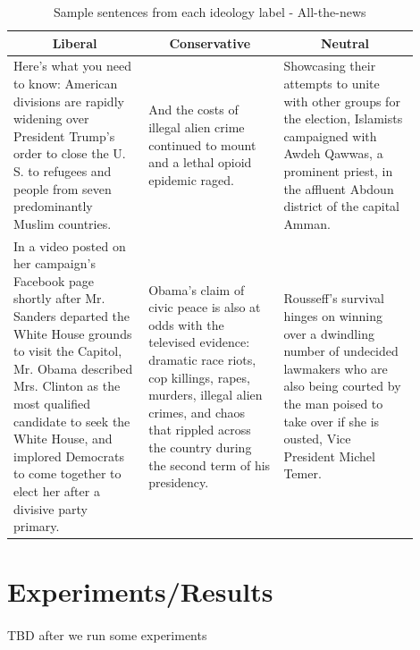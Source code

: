 \documentclass[10pt,a4paper,onecolumn]{article}
\begin{document}
\begin{table}[h!]
	\begin{center}
		\caption{Sample sentences from each ideology label - All-the-news	}
		\label{tab:atn-sentences}
		\begin{tabular}{p{0.3\linewidth}|p{0.3\linewidth}|p{0.3\linewidth}}
			\hline\hline
			\multicolumn{1}{c|}{\textbf{Liberal}} & \multicolumn{1}{c|}{\textbf{Conservative}} & \multicolumn{1}{c|}{\textbf{Neutral}}\\
			\hline
			Here’s what you need to know: American divisions are rapidly widening over President Trump’s order to close the U. S. to refugees and people from seven predominantly Muslim countries. & And the costs of illegal alien crime continued to mount and a lethal opioid epidemic raged. & Showcasing their attempts to unite with other groups for the election, Islamists campaigned with Awdeh Qawwas, a prominent priest, in the affluent Abdoun district of the capital Amman. \\
			In a video posted on her campaign’s Facebook page shortly after Mr. Sanders departed the White House grounds to visit the Capitol, Mr. Obama described Mrs. Clinton as the most qualified candidate to seek the White House, and implored Democrats to come together to elect her after a divisive party primary. & Obama’s claim of civic peace is also at odds with the televised evidence: dramatic race riots, cop killings, rapes, murders, illegal alien crimes, and chaos that rippled across the country during the second term of his presidency. & Rousseff’s survival hinges on winning over a dwindling number of undecided lawmakers who are also being courted by the man poised to take over if she is ousted, Vice President Michel Temer. \\
			\hline\hline
		\end{tabular}
	\end{center}
\end{table}

\section{Experiments/Results}
\paragraph{}
TBD after we run some experiments
\end{document}
